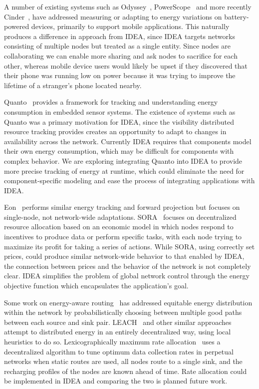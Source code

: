 A number of existing systems such as Odyssey~\cite{odyssey-osr99},
PowerScope~\cite{powerscope-wmcsa99} and more recently
Cinder~\cite{cinder-mobiheld09}, have addressed measuring or adapting to
energy variations on battery-powered devices, primarily to support mobile
applications. This naturally produces a difference in approach from IDEA,
since IDEA targets networks consisting of multiple nodes but treated as a
single entity. Since nodes are collaborating we can enable more sharing and
ask nodes to sacrifice for each other, whereas mobile device users would
likely be upset if they discovered that their phone was running low on power
because it was trying to improve the lifetime of a stranger's phone located
nearby.

Quanto~\cite{quanto-osdi08} provides a framework for tracking and
understanding energy consumption in embedded sensor systems. The existence of
systems such as Quanto was a primary motivation for IDEA, since the
visibility distributed resource tracking provides creates an opportunity to
adapt to changes in availability across the network. Currently IDEA requires
that components model their own energy consumption, which may be difficult
for components with complex behavior. We are exploring integrating Quanto
into IDEA to provide more precise tracking of energy at runtime, which could
eliminate the need for component-specific modeling and ease the process of
integrating applications with IDEA.

Eon~\cite{eon-sensys07} performs similar energy tracking and forward
projection but focuses on single-node, not network-wide adaptations.
SORA~\cite{sora-nsdi05} focuses on decentralized resource allocation based on
an economic model in which nodes respond to incentives to produce data or
perform specific tasks, with each node trying to maximize its profit for
taking a series of actions. While SORA, using correctly set prices, could
produce similar network-wide behavior to that enabled by IDEA, the connection
between prices and the behavior of the network is not completely clear. IDEA
simplifies the problem of global network control through the energy objective
function which encapsulates the application's goal.

Some work on energy-aware routing~\cite{ShahRabaey2002,381685} has addressed
equitable energy distribution within the network by probabilistically
choosing between multiple good paths between each source and sink pair.
LEACH~\cite{leach} and other similar approaches attempt to distributed energy
in an entirely decentralized way, using local heuristics to do so.
Lexicographically maximum rate allocation~\cite{fairrate-sensys08} uses a
decentralized algorithm to tune optimum data collection rates in perpetual
networks when static routes are used, all nodes route to a single sink, and
the recharging profiles of the nodes are known ahead of time. Rate allocation
could be implemented in IDEA and comparing the two is planned future work.


